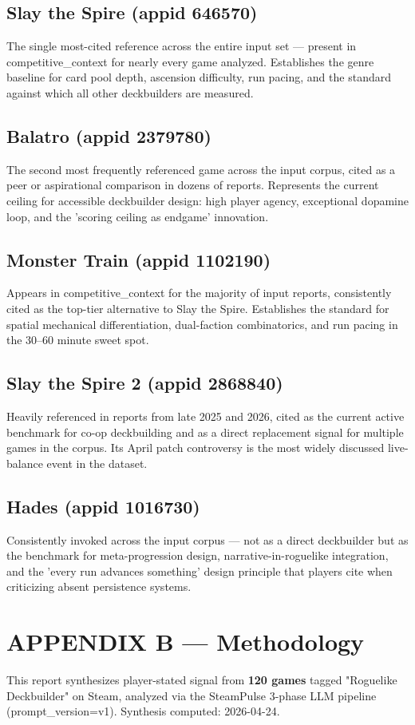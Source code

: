 \documentclass[11pt,letterpaper]{report}
\begin{document}
\chapter*{Slay the Spire (appid 646570)}
\label{sec:org9f0ddf6}
The single most-cited reference across the entire input set — present in competitive\_context for nearly every game analyzed. Establishes the genre baseline for card pool depth, ascension difficulty, run pacing, and the standard against which all other deckbuilders are measured.
\chapter*{Balatro (appid 2379780)}
\label{sec:orgb3a68a0}
The second most frequently referenced game across the input corpus, cited as a peer or aspirational comparison in dozens of reports. Represents the current ceiling for accessible deckbuilder design: high player agency, exceptional dopamine loop, and the 'scoring ceiling as endgame' innovation.
\chapter*{Monster Train (appid 1102190)}
\label{sec:org4bcd1de}
Appears in competitive\_context for the majority of input reports, consistently cited as the top-tier alternative to Slay the Spire. Establishes the standard for spatial mechanical differentiation, dual-faction combinatorics, and run pacing in the 30–60 minute sweet spot.
\chapter*{Slay the Spire 2 (appid 2868840)}
\label{sec:orgb9a7399}
Heavily referenced in reports from late 2025 and 2026, cited as the current active benchmark for co-op deckbuilding and as a direct replacement signal for multiple games in the corpus. Its April patch controversy is the most widely discussed live-balance event in the dataset.
\chapter*{Hades (appid 1016730)}
\label{sec:org39b91d7}
Consistently invoked across the input corpus — not as a direct deckbuilder but as the benchmark for meta-progression design, narrative-in-roguelike integration, and the 'every run advances something' design principle that players cite when criticizing absent persistence systems.
\part*{APPENDIX B — Methodology}
\label{sec:org13c8897}
This report synthesizes player-stated signal from \textbf{120 games} tagged "Roguelike Deckbuilder" on Steam, analyzed via the SteamPulse 3-phase LLM pipeline (prompt\_version=v1). Synthesis computed: 2026-04-24.
\end{document}

